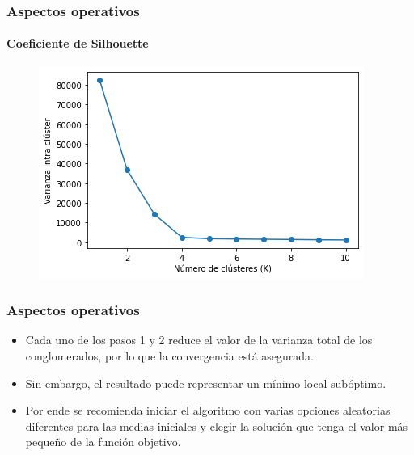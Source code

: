 \documentclass[
  shownotes,
  xcolor={svgnames},
  hyperref={colorlinks,citecolor=DarkBlue,linkcolor=DarkRed,urlcolor=DarkBlue}
  , aspectratio=169]{beamer}
\begin{document}
\begin{frame}
\frametitle{Aspectos operativos}
\framesubtitle{Coeficiente de Silhouette}

\begin{figure}[H] \centering

    \centering
    \includegraphics[scale=.7]{figures/output_35_0.png}
  \\
  \tiny
\end{figure}
\end{frame}
\begin{frame}
\frametitle{Aspectos operativos}

\begin{itemize}
\item Cada uno de los pasos 1 y 2 reduce el valor de la varianza total de los conglomerados, por lo que la convergencia está asegurada.
\medskip
 \item Sin embargo, el resultado puede representar un mínimo local subóptimo. 

 \medskip
 \item Por ende se recomienda iniciar el algoritmo con varias opciones aleatorias diferentes para las medias iniciales y elegir la solución que tenga el
valor más pequeño de la función objetivo.
\end{itemize}
\end{frame}   
\end{document}
